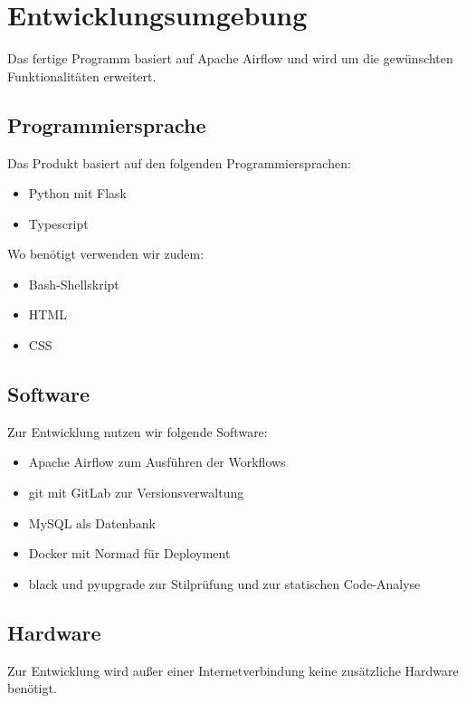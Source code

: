 \chapter{Entwicklungsumgebung}
Das fertige Programm basiert auf \gls{Apache Airflow} und wird um die gewünschten Funktionalitäten erweitert.
\section{Programmiersprache}
Das Produkt basiert auf den folgenden Programmiersprachen:
\begin{itemize}
    \setlength\itemsep{-1em}
    \item Python mit Flask
    \item Typescript
\end{itemize}
Wo benötigt verwenden wir zudem:
\begin{itemize}
    \setlength\itemsep{-1em}
    \item Bash-Shellskript 
    \item HTML
    \item CSS
\end{itemize}
\newpage
\section{Software}
Zur Entwicklung nutzen wir folgende Software:
\begin{itemize}
    \setlength\itemsep{-1em}
    \item Apache Airflow zum Ausführen der \glspl{Workflow}
    \item git mit GitLab zur Versionsverwaltung
    \item MySQL als Datenbank
    \item Docker mit Normad für Deployment
    \item black und pyupgrade zur Stilprüfung und zur statischen Code-Analyse
\end{itemize}


\section{Hardware}
Zur Entwicklung wird außer einer Internetverbindung keine zusätzliche Hardware benötigt.